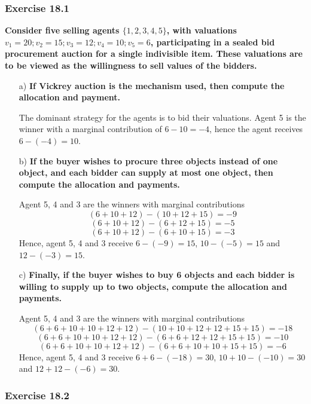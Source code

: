 \documentclass[12pt, a4paper]{article}
\begin{document}
\subsubsection*{Exercise 18.1}

\textbf{Consider five selling agents $\{1, 2, 3, 4, 5\}$, with valuations $v_1 = 20; v_2 = 15; v_3 = 12; v_4 = 10; v_5 = 6$, participating in a sealed bid procurement auction for a single indivisible item. These valuations are to be viewed as the willingness to sell values of the bidders.}
\begin{enumerate}
	\item[a)] \textbf{If Vickrey auction is the mechanism used, then compute the allocation and payment.}
	 
	The dominant strategy for the agents is to bid their valuations.
	Agent 5 is the winner with a marginal contribution of $6 - 10 = -4$, hence the agent receives $6 - (-4)= 10$.

	\item[b)] \textbf{If the buyer wishes to procure three objects instead of one object, and each bidder can supply at most one object, then compute the allocation and payments.}
	
	Agent 5, 4 and 3 are the winners with marginal contributions
	\[ (6 + 10 + 12) - (10 + 12 + 15) = -9 \]
	\[ (6 + 10 + 12) - ( 6 + 12 + 15) = -5 \]
	\[ (6 + 10 + 12) - ( 6 + 10 + 15) = -3 \]
	Hence, agent 5, 4 and 3 receive $6 - (-9) = 15$, $10 - (-5) = 15$ and $12 - (-3) = 15$.

	\item[c)] \textbf{Finally, if the buyer wishes to buy 6 objects and each bidder is willing to supply up to two objects, compute the allocation and payments.}
	
	Agent 5, 4 and 3 are the winners with marginal contributions
	\[ (6 + 6 + 10 + 10 + 12 + 12) - (10 + 10 + 12 + 12 + 15 + 15) = -18 \]
	\[ (6 + 6 + 10 + 10 + 12 + 12) - ( 6 +  6 + 12 + 12 + 15 + 15) = -10 \]
	\[ (6 + 6 + 10 + 10 + 12 + 12) - ( 6 +  6 + 10 + 10 + 15 + 15) = -6 \]
	Hence, agent 5, 4 and 3 receive $6 + 6 - (-18) = 30$, $10 + 10 - (-10) = 30$ and $12 + 12 - (-6) = 30$.

\end{enumerate}

\subsubsection*{Exercise 18.2}
\end{document}
